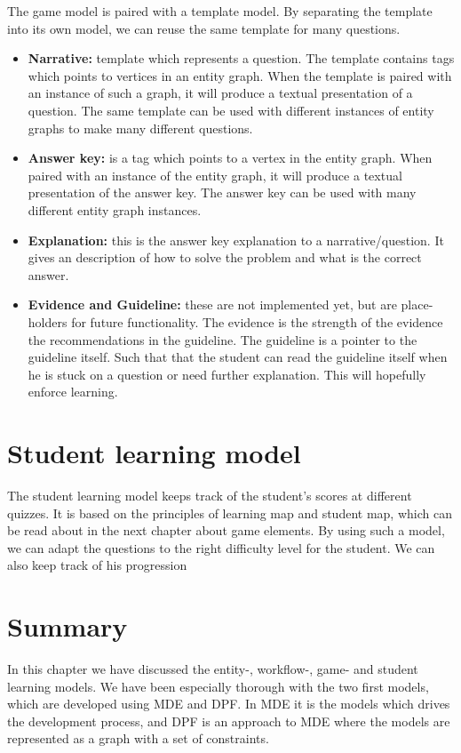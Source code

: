 The game model is paired with a template model. By separating the template into its own model, we can reuse the same template for many questions.
\begin{itemize}
	\item \textbf{Narrative:} template which represents a question. The template contains tags which points to vertices in an entity graph. When the template is paired with an instance of such a graph, it will produce a textual presentation of a question. The same template can be used with different instances of entity graphs to make many different questions.
	\item \textbf{Answer key:} is a tag which points to a vertex in the entity graph. When paired with an instance of the entity graph, it will produce a textual presentation of the answer key. The answer key can be used with many different entity graph instances.
	\item \textbf{Explanation:} this is the answer key explanation to a narrative/question. It gives an description of how to solve the problem and what is the correct answer.
	\item \textbf{Evidence and Guideline:} these are not implemented yet, but are place-holders for future functionality. The evidence is the strength of the evidence the recommendations in the guideline. The guideline is a pointer to the guideline itself. Such that that the student can read the guideline itself when he is stuck on a question or need further explanation. This will hopefully enforce learning.
\end{itemize}

\section{Student learning model}
The student learning model keeps track of the student's scores at different quizzes. It is based on the principles of learning map and student map, which can be read about in the next chapter about game elements. By using such a model, we can adapt the questions to the right difficulty level for the student. We can also keep track of his progression

\section{Summary}
In this chapter we have discussed the entity-, workflow-, game- and student learning models. We have been especially thorough with the two first models, which are developed using MDE and DPF. In MDE it is the models which drives the development process, and DPF is an approach to MDE where the models are represented as a graph with a set of constraints.

